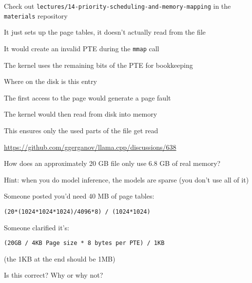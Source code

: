   \begin{slide}
    

    Check out \texttt{lectures/14-priority-scheduling-and-memory-mapping} in the
    \texttt{materials} repository

  \end{slide}

  \begin{slide}
    

    It just sets up the page tables, it doesn't actually read from the file
    \medskip

    It would create an invalid PTE during the \texttt{mmap} call
    \medskip

    The kernel uses the remaining bits of the PTE for bookkeeping

    \leftspace{}Where on the disk is this entry
    \medskip

    The first access to the page would generate a page fault

    \leftspace{}The kernel would then read from disk into memory
    \medskip

    This ensures only the used parts of the file get read

  \end{slide}

  \begin{slide}
    

    \url{https://github.com/ggerganov/llama.cpp/discussions/638}
    \medskip

    How does an approximately 20 GB file only use 6.8 GB of real memory?
    \medskip

    Hint: when you do model inference, the models are sparse (you don't use all
    of it)

  \end{slide}

  \begin{slide}
    

    Someone posted you'd need 40 MB of page tables:

    \texttt{(20*(1024*1024*1024)/4096*8) / (1024*1024)}
    \medskip

    Someone clarified it's:

    \texttt{(20GB / 4KB Page size * 8 bytes per PTE) / 1KB}

    \leftspace{}(the 1KB at the end should be 1MB)
    \medskip

    Is this correct? Why or why not?

  \end{slide}

